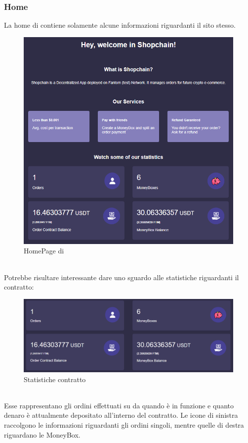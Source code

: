         \subsubsection{Home}
        La home di \projectName{} contiene solamente alcune informazioni riguardanti il sito stesso.
        \begin{figure}[H]
            \centering
            \includegraphics[scale=0.5]{immagini/Home.png}
            \caption{HomePage di \projectName{}}
        \end{figure}
        \textbf{}\\
        Potrebbe risultare interessante dare uno sguardo alle statistiche riguardanti il contratto:
        \begin{figure}[H]
            \centering
            \includegraphics[scale=0.4]{immagini/ContractDetails.png}
            \caption{Statistiche contratto}
        \end{figure}
        \textbf{}\\
        Esse rappresentano gli ordini effettuati su \projectName{} da quando è in funzione e quanto denaro è attualmente depositato all'interno del contratto. Le icone di sinistra raccolgono le informazioni riguardanti gli ordini singoli, mentre quelle di destra riguardano le MoneyBox.
